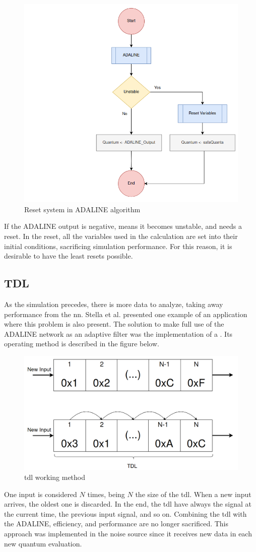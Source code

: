 \begin{figure}[H]
	\centering
 	\includegraphics[width=0.5\linewidth]{Images/ResetSystemADALINE.png}
 	\caption{Reset system in ADALINE algorithm}
	 \label{fig_ResetSystemADALINE}
\end{figure}

If the ADALINE output is negative, means it becomes unstable, and needs a reset. In the reset, all the variables used in the calculation are set into their initial conditions, sacrificing simulation performance. For this reason, it is desirable to have the least resets possible.

\subsection{TDL}

As the simulation precedes, there is more data to analyze, taking away performance from the \gls{nn}. Stella et al. \cite{noiseCancelingADALINE} presented one example of an application where this problem is also present. The solution to make full use of the ADALINE network as an adaptive filter was the implementation of a . Its operating method is described in the figure below. 

\begin{figure}[H]
	\centering
 	\includegraphics[width=0.5\linewidth]{Images/TDL.png}
 	\caption{\gls{tdl} working method}
	 \label{fig_TDL}
\end{figure}

One input is considered $N$ times, being $N$ the size of the \gls{tdl}. When a new input arrives, the oldest one is discarded. In the end, the \gls{tdl} have always the signal at the current time, the previous input signal, and so on. Combining the \gls{tdl} with the ADALINE, efficiency, and performance are no longer sacrificed. This approach was implemented in the noise source since it receives new data in each new quantum evaluation. 

